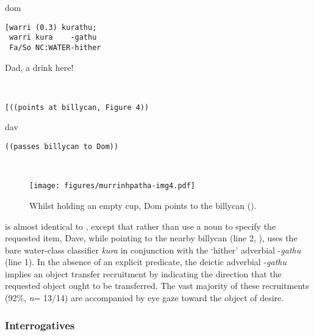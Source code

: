 \documentclass[output=paper,nonflat,colorlinks,citecolor=brown]{langsci/langscibook}
\begin{document}
\vspace{2mm}
%
\begin{transbox}{1}{dom}
\begin{verbatim}
[warri (0.3) kurathu;
 warri kura    -gathu
 Fa/So NC:WATER-hither
\end{verbatim}
\hspace{0.07cm} Dad, a drink here!
\end{transbox}\vspace{1mm}
%
\begin{transbox}{2}{~}
\begin{verbatim}
[((points at billycan, Figure 4))
\end{verbatim}
\end{transbox}\vspace{-1mm}
%
\begin{transbox}{3}{dav}
\begin{verbatim}
((passes billycan to Dom))
\end{verbatim}
\end{transbox}\\

\begin{figure}
\texttt{[image: figures/murrinhpatha-img4.pdf]}
\caption{Whilst holding an empty cup, Dom points to the billycan ().}
\label{fig:blythe:4}
\end{figure}

 is almost identical to , except that rather than use a noun to specify the requested item, Dave, while pointing to the nearby billycan (line 2, ), uses the bare water-class classifier \textit{kura} in conjunction with the ‘hither’ adverbial -\textit{gathu} (line 1). In the absence of an explicit predicate, the deictic adverbial -\textit{gathu} implies an object transfer recruitment by indicating the direction that the requested object ought to be transferred. The vast majority of these recruitments (92\%, \textit{n}= 13/14) are accompanied by eye gaze toward the object of desire.

\subsubsection{Interrogatives}\label{sec:blythe:3.3.3}
\end{document}
